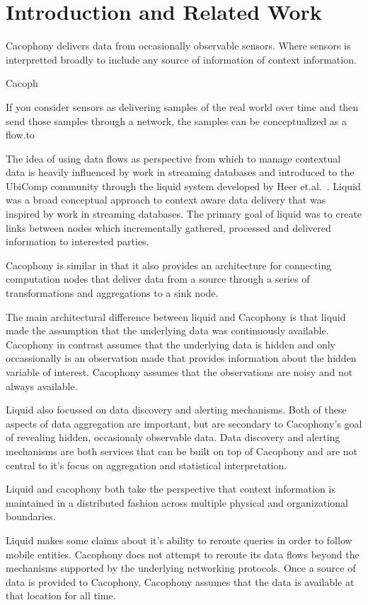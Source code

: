 \section{Introduction and Related Work}

Cacophony delivers data from occasionally observable sensors.  Where sensors is
interpretted broadly to include any source of information of context
information.

Cacoph

If you consider sensors as delivering samples of the real world over time and
then send those samples through a network, the samples can be conceptualized as
a flow.to 


The idea of using data flows as perspective from which to manage contextual data
is heavily influenced by work in streaming databases and introduced to the
UbiComp community through the liquid system developed by Heer
et.al.~\cite{HeerNBH03}.  Liquid was a broad conceptual approach to context
aware data delivery that was inspired by work in streaming databases.  The
primary goal of liquid was to create links between nodes which incrementally
gathered, processed and delivered information to interested parties.

Cacophony is similar in that it also provides an architecture for connecting
computation nodes that deliver data from a source through a series of
transformations and aggregations to a sink node.

The main architectural difference between liquid and Cacophony is that liquid
made the assumption that the underlying data was continuously available.
Cacophony in contrast assumes that the underlying data is hidden and only
occassionally is an observation made that provides information about the hidden
variable of interest.  Cacophony assumes that the observations are noisy and not
always available.

Liquid also focussed on data discovery and alerting mechanisms.  Both of these
aspects of data aggregation are important, but are secondary to Cacophony's goal
of revealing hidden, occasionaly observable data.  Data discovery and alerting
mechanisms are both services that can be built on top of Cacophony and are not
central to it's focus on aggregation and statistical interpretation. 

Liquid and cacophony both take the perspective that context information is
maintained in a distributed fashion across multiple physical and organizational
boundaries.

Liquid makes some claims about it's ability to reroute queries in order to
follow mobile entities.  Cacophony does not attempt to reroute its data flows
beyond the mechanisms supported by the underlying networking protocols.  Once a
source of data is provided to Cacophony, Cacophony assumes that the data is
available at that location for all time.

